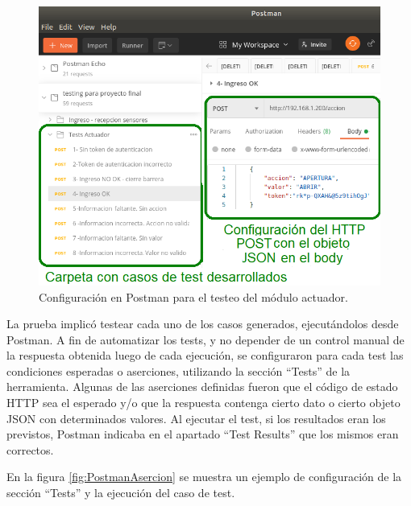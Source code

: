 \begin{figure}[ht]
	\centering
	\includegraphics[width=1\textwidth]{./Figures/TestActuadorConfig.png}
	\caption{Configuración en Postman para el testeo del módulo actuador.}
	\label{fig:TestActuadorConfig}
\end{figure}

La prueba implicó testear cada uno de los casos generados, ejecutándolos desde Postman. A fin de automatizar los tests, y no depender de un control manual de la respuesta obtenida luego de cada ejecución, se configuraron para cada test las condiciones esperadas o aserciones, utilizando la sección ``Tests'' de la herramienta. Algunas de las aserciones definidas fueron que el código de estado HTTP sea el esperado y/o que la respuesta contenga cierto dato o cierto objeto JSON con determinados valores. Al ejecutar el test, si los resultados eran los previstos, Postman indicaba en el apartado ``Test Results'' que los mismos eran correctos.

En la figura \ref{fig:PostmanAsercion} se muestra un ejemplo de configuración de la sección ``Tests'' y la ejecución del caso de test.

